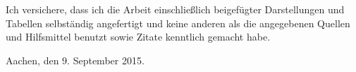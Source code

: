 
Ich versichere, dass ich die Arbeit einschließlich beigefügter Darstellungen und Tabellen selbständig angefertigt und keine anderen als die angegebenen Quellen und Hilfsmittel benutzt sowie Zitate kenntlich gemacht habe. 

Aachen, den 9. September 2015. 